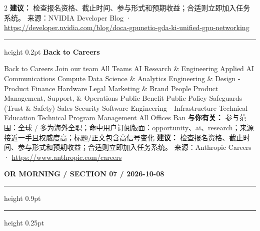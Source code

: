 \documentclass[10.5pt]{ctexart}
\begin{document}
\begin{multicols}{2}
\textbf{建议：} 检查报名资格、截止时间、参与形式和预期收益；合适则立即加入任务系统。
{\footnotesize\color{ormuted} 来源：NVIDIA Developer Blog · \url{https://developer.nvidia.com/blog/doca-gpunetio-gda-ki-unified-gpu-networking}}
\vspace{2mm}
\hrule height 0.2pt
\vspace{2mm}
{\large\bfseries Back to Careers}\par
Back to Careers Join our team All Teams AI Research \& Engineering Applied AI Communications Compute Data Science \& Analytics Engineering \& Design - Product Finance Hardware Legal Marketing \& Brand People Product Management, Support, \& Operations Public Benefit Public Policy Safeguards (Trust \& Safety) Sales Security Software Engineering - Infrastructure Technical Education Technical Program Management All Offices Ban
\textbf{与你有关：} 参与范围：全球 / 多为海外全职；命中用户订阅版面：opportunity、ai、research；来源接近一手且权威度高；标题/正文包含高信号变化
\textbf{建议：} 检查报名资格、截止时间、参与形式和预期收益；合适则立即加入任务系统。
{\footnotesize\color{ormuted} 来源：Anthropic Careers · \url{https://www.anthropic.com/careers}}
\end{multicols}
\newpage
{\small\bfseries OR MORNING / SECTION 07 / 2026-10-08}
\vspace{2mm}
\hrule height 0.9pt
\vspace{1.5mm}
\hrule height 0.25pt
\vspace{4mm}
\end{document}
